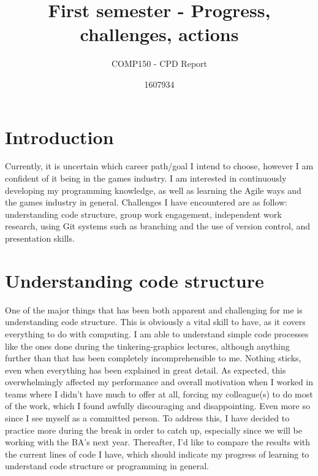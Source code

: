 \documentclass{scrartcl}
\title{First semester - Progress, challenges, actions}
\subtitle{COMP150 - CPD Report}
\author{1607934}
\begin{document}
\maketitle

\section{Introduction}

Currently, it is uncertain which career path/goal I intend to choose, however I am confident of it being in the games industry. I am interested in continuously developing my programming knowledge, as well as learning the Agile ways and the games industry in general. Challenges I have encountered are as follow: understanding code structure, group work engagement, independent work research, using Git systems such as branching and the use of version control, and presentation skills. 

\section{Understanding code structure}
One of the major things that has been both apparent and challenging for me is understanding code structure. This is obviously a vital skill to have, as it covers everything to do with computing. I am able to understand simple code processes like the ones done during the tinkering-graphics lectures, although anything further than that has been completely incomprehensible to me. Nothing sticks, even when everything has been explained in great detail. As expected, this overwhelmingly affected my performance and overall motivation when I worked in teams where I didn't have much to offer at all, forcing my colleague(s) to do most of the work, which I found awfully discouraging and disappointing. Even more so since I see myself as a committed person. To address this, I have decided to practice more during the break in order to catch up, especially since we will be working with the BA's next year. Thereafter, I'd like to compare the results with the current lines of code I have, which should indicate my progress of learning to understand code structure or programming in general.  
\end{document}
